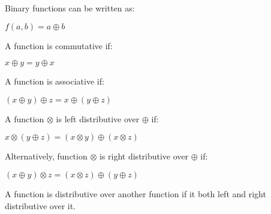 Binary functions can be written as:

$f(a,b)=a\oplus b$

A function is commutative if:

$x\oplus y = y\oplus x$

A function is associative if:

$(x\oplus y)\oplus z = x\oplus (y\oplus z)$

A function \(\otimes \) is left distributive over \(\oplus \) if:

$x\otimes (y\oplus z)=(x\otimes y) \oplus (x\otimes z)$

Alternatively, function \(\otimes \) is right distributive over \(\oplus \) if:

$(x\oplus y)\otimes z=(x\otimes z) \oplus (y\oplus z)$

A function is distributive over another function if it both left and right distributive over it.

